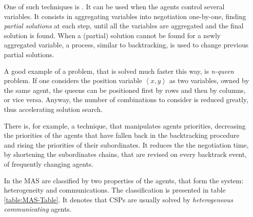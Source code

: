 \documentclass[ThesisDoc]{subfiles}
\begin{document}
One of such techniques is .
It can be used when the agents control several variables. It consists in
aggregating variables into negotiation one-by-one, finding \emph{partial solutions}
at each step, until all the variables are aggregated and the final solution
is found. When a (partial) solution cannot be found for a newly aggregated
variable, a process, similar to backtracking, is used to change previous
partial solutions.

A good example of a problem, that is solved much faster this way, is
\emph{n-queen} problem. If one considers the position variable
$\left< x,y \right>$ as two variables, owned by the same agent, the queens
can be positioned first by rows and then by columns, or vice versa. Anyway,
the number of combinations to consider is reduced greatly, thus accelerating
solution search.

There is, for example, a technique, that manipulates agents priorities,
decreasing the priorities of the agents that have fallen back in the backtracking
procedure and rising the priorities of their subordinates. It reduces the
the negotiation time, by shortening the subordinates chains, that are
revised on every backtrack event, of frequently changing agents.

\bigskip

\noindent
In \cite{MAS-Survey} the MAS are classified by two properties of the agents,
that form the system: heterogeneity and communications.
The classification is presented in table \ref{table:MAS-Table}. It denotes
that CSPs are usually solved by \emph{heterogeneous communicating} agents.
\end{document}
